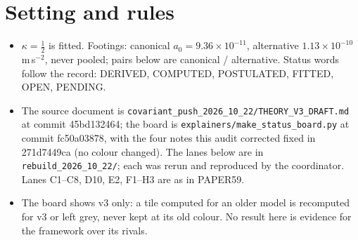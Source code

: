 \documentclass[10pt]{article}
\begin{document}
\begin{abstract}
\begin{enumerate}
\item \textbf{Linear growth: no allowed $\mu_K$.} The dust holds only below the scale $\mu_K$, which Blanchet and Skordis cap at 14.8\,$h$/Mpc; at the cap v3 reaches 0.391 of the dust-limit $\sigma_8$, and reaching 0.95 needs $\mu_K\ge361$--2542\,$h$/Mpc, 24--172 times the cap. The galaxy passes need $\mu_K<0.1$\,Mpc$^{-1}$, so in the static branch no single $\mu_K$ serves both. The literal dust sector also has no radiation era; Blanchet and Skordis's later DBI form fixes BBN only.
\item \textbf{Saddles: ill-posed.} Where the khronon density is negative, at every two-body saddle and in the external-field lobes, the screening term turns the khronon/dust pair into an unbounded gradient instability. The term that passes Cassini is the term that breaks well-posedness.
\item \textbf{The pattern.} Each repair tried so far moves the failure rather than removing it (Table~\ref{tab:repairs}). v3 is an effective theory of the acceleration scale and the mean radial-acceleration relation of isolated systems, with a screened Solar System. It is not a cluster theory, not a cosmology, and not well posed at saddles.
\end{enumerate}
\end{abstract}

\section{Setting and rules}
\begin{itemize}
\item $\kappa=\tfrac12$ is fitted. Footings: canonical $a_0=9.36\times10^{-11}$, alternative $1.13\times10^{-10}$\,m\,s$^{-2}$, never pooled; pairs below are canonical / alternative. Status words follow the record: DERIVED, COMPUTED, POSTULATED, FITTED, OPEN, PENDING.
\item The source document is \texttt{covariant\_push\_2026\_10\_22/THEORY\_V3\_DRAFT.md} at commit 45bd132464; the board is \texttt{explainers/make\_status\_board.py} at commit fc50a03878, with the four notes this audit corrected fixed in 271d7449ca (no colour changed). The lanes below are in \texttt{rebuild\_2026\_10\_22/}; each was rerun and reproduced by the coordinator. Lanes C1--C8, D10, E2, F1--H3 are as in PAPER59.
\item The board shows v3 only: a tile computed for an older model is recomputed for v3 or left grey, never kept at its old colour. No result here is evidence for the framework over its rivals.
\end{itemize}
\end{document}
